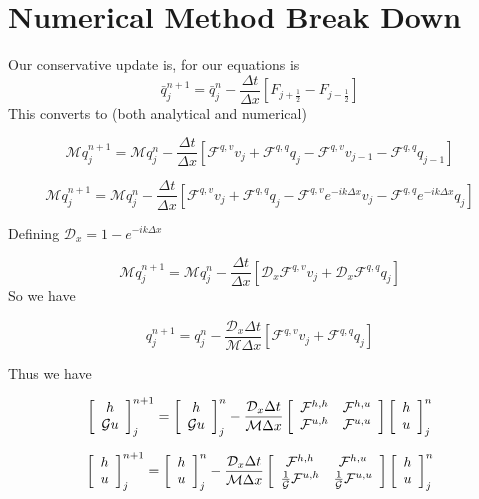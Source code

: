 \documentclass[12pt]{article}
\begin{document}
\section{Numerical Method Break Down}
Our conservative update is, for our equations is
\[\bar{q}_j^{n+1} = \bar{q}_j^{n} - \frac{\Delta t}{\Delta x} \left[F_{j + \frac{1}{2}} - F_{j - \frac{1}{2}} \right] \]
This converts to (both analytical and numerical)

\[\mathcal{M}q_j^{n+1} = \mathcal{M}q_j^{n} - \frac{\Delta t}{\Delta x} \left[\mathcal{F}^{q,v}v_{j} + \mathcal{F}^{q,q}q_{j} - \mathcal{F}^{q,v}v_{j-1} - \mathcal{F}^{q,q}q_{j-1} \right] \]

\[\mathcal{M}q_j^{n+1} = \mathcal{M}q_j^{n} - \frac{\Delta t}{\Delta x} \left[\mathcal{F}^{q,v}v_{j} + \mathcal{F}^{q,q}q_{j} - \mathcal{F}^{q,v}e^{-ik\Delta x}v_{j} - \mathcal{F}^{q,q}e^{-ik\Delta x}q_{j} \right] \]

Defining $\mathcal{D}_x = 1 - e^{-ik\Delta x} $

\[\mathcal{M}q_j^{n+1}  = \mathcal{M}q_j^{n}   - \frac{\Delta t}{\Delta x} \left[ \mathcal{D}_x\mathcal{F}^{q,v}v_{j} + \mathcal{D}_x\mathcal{F}^{q,q}q_{j}\right] \]
So we have

\[q_j^{n+1}  = q_j^{n}   - \frac{\mathcal{D}_x\Delta t}{\mathcal{M}\Delta x} \left[ \mathcal{F}^{q,v}v_{j} + \mathcal{F}^{q,q}q_{j}\right] \]

Thus we have

\[\left[\begin{array}{c}
h \\ \mathcal{G}u
\end{array}\right]^{n+1}_j = \left[\begin{array}{c}
h \\ \mathcal{G}u
\end{array}\right]^{n}_j - \frac{\mathcal{D}_x\Delta t}{\mathcal{M}\Delta x}\left[\begin{array}{c c}
\mathcal{F}^{h,h} & \mathcal{F}^{h,u} \\ \mathcal{F}^{u,h} & \mathcal{F}^{u,u} 
\end{array}\right]\left[\begin{array}{c}
h \\ u
\end{array}\right]^{n}_j  \]

\[\left[\begin{array}{c}
h \\ u
\end{array}\right]^{n+1}_j = \left[\begin{array}{c}
h \\ u
\end{array}\right]^{n}_j - \frac{\mathcal{D}_x\Delta t}{\mathcal{M}\Delta x}\left[\begin{array}{c c}
\mathcal{F}^{h,h} & \mathcal{F}^{h,u} \\ \frac{1}{\mathcal{G}}\mathcal{F}^{u,h} &  \frac{1}{\mathcal{G}}\mathcal{F}^{u,u} 
\end{array}\right]\left[\begin{array}{c}
h \\ u
\end{array}\right]^{n}_j  \]
\end{document}
